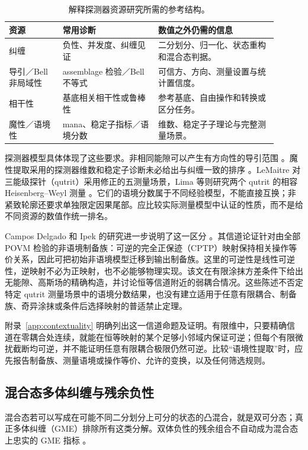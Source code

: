 \documentclass[UTF8,11pt,a4paper,fontset=none]{ctexart}
\begin{document}
\begin{table}[htbp]
\centering\small
\caption{解释探测器资源研究所需的参考结构。}
\label{tab:resource-types}
\begin{tabular}{p{0.18\linewidth}p{0.32\linewidth}p{0.40\linewidth}}
\toprule
资源 & 常用诊断 & 数值之外仍需的信息\\
\midrule
纠缠 & 负性、并发度、纠缠见证 & 二分划分、归一化、状态重构和混合态判据。\\
导引／Bell 非局域性 & assemblage 检验／Bell 不等式 & 可信方、方向、测量设置与统计置信度。\\
相干性 & 基底相关相干性或鲁棒性 & 参考基底、自由操作和转换或区分任务。\\
魔性／语境性 & mana、稳定子指标／语境分数 & 维数、稳定子子理论与完整测量场景。\\
\bottomrule
\end{tabular}
\end{table}

探测器模型具体体现了这些要求。非相同能隙可以产生有方向性的导引范围 \cite{Wu2025}。魔性提取采用的探测器维数和稳定子诊断未必给出与纠缠一致的排序 \cite{Nystrom2025,Cepollaro2025}。LeMaitre 对三能级探针（qutrit）采用修正的五测量场景，Lima 等则研究两个 qutrit 的相容 Heisenberg--Weyl 测量 \cite{LeMaitre2026,LimaPreciadoSrivastava2026}。它们的语境分数属于不同经验模型，不能直接互换；非紧致轮廓还要求单独限定因果尾部。应比较实际测量模型中认证的性质，而不是给不同资源的数值作统一排名。

Campos Delgado 和 Ipek 的研究进一步说明了这一区分 \cite{CamposDelgadoIpek2026}。其信道论证针对由全部 POVM 检验的非语境制备族：可逆的完全正保迹（CPTP）映射保持相关操作等价关系，因此可把初始非语境模型迁移到输出制备族。这里的可逆性是线性可逆性，逆映射不必为正映射，也不必能够物理实现。该文在有限涂抹方差条件下给出无能隙、高斯场的精确构造，并讨论恒等信道附近的弱耦合情况。这些陈述不否定特定 qutrit 测量场景中的语境分数结果，也没有建立适用于任意有限耦合、制备族、奇异涂抹或条件后选择映射的普适禁止定理。

附录~\ref{app:contextuality} 明确列出这一信道命题及证明。有限维中，只要精确信道在零耦合处连续，就能在恒等映射的某个足够小邻域内保证可逆；但每个有限微扰截断均可逆，并不能证明任意有限耦合极限仍然可逆。比较“语境性提取”时，应先报告制备族、测量语境或操作等价、允许的变换，以及任何筛选规则。

\subsection{混合态多体纠缠与残余负性}
\label{subsec:multipartite-topology}
混合态若可以写成在可能不同二分划分上可分的状态的凸混合，就是双可分态；真正多体纠缠（GME）排除所有这类分解。双体负性的残余组合不自动成为混合态上忠实的 GME 指标 \cite{GuhneSeevinck2010,OuFan2007,MaLiShang2025}。
\end{document}
